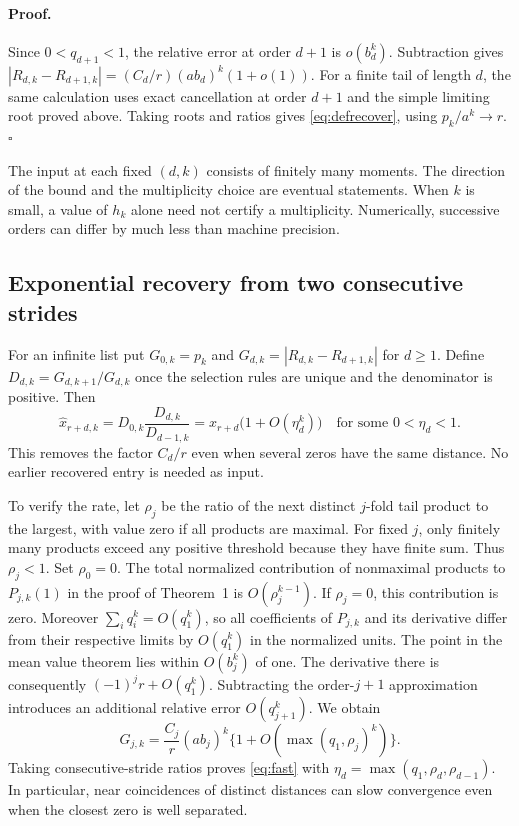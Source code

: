 \documentclass[11pt]{article}
\begin{document}
\paragraph{Proof.}
Since $0<q_{d+1}<1$, the relative error at order $d+1$ is $o(b_d^k)$.
Subtraction gives
$|R_{d,k}-R_{d+1,k}|=(C_d/r)(a b_d)^k(1+o(1))$.
For a finite tail of length $d$, the same calculation uses exact cancellation
at order $d+1$ and the simple limiting root proved above. Taking roots and
ratios gives \eqref{eq:defrecover}, using $p_k/a^k\to r$.
\hfill$\square$

The input at each fixed $(d,k)$ consists of finitely many moments. The direction
of the bound and the multiplicity choice are eventual statements. When $k$ is
small, a value of $h_k$ alone need not certify a multiplicity. Numerically,
successive orders can differ by much less than machine precision.


\subsection*{Exponential recovery from two consecutive strides}
For an infinite list put $G_{0,k}=p_k$ and
$G_{d,k}=|R_{d,k}-R_{d+1,k}|$ for $d\ge1$. Define
$D_{d,k}=G_{d,k+1}/G_{d,k}$ once the selection rules are unique and the
denominator is positive. Then
\begin{equation}\label{eq:fast}
 \widehat{x}_{r+d,k}=D_{0,k}\frac{D_{d,k}}{D_{d-1,k}}
       = x_{r+d}\bigl(1+O(\eta_d^k)\bigr)
       \quad\text{for some }0<\eta_d<1.
\end{equation}
This removes the factor $C_d/r$ even when several zeros have the same distance.
No earlier recovered entry is needed as input.

To verify the rate, let $\rho_j$ be the ratio of the next distinct $j$-fold
tail product to the largest, with value zero if all products are maximal.
For fixed $j$, only finitely many products exceed any positive threshold
because they have finite sum. Thus $\rho_j<1$. Set $\rho_0=0$.
The total normalized contribution of nonmaximal products to $P_{j,k}(1)$
in the proof of Theorem~1 is $O(\rho_j^{k-1})$. If $\rho_j=0$, this
contribution is zero. Moreover $\sum_i q_i^k=O(q_1^k)$, so all coefficients
of $P_{j,k}$ and its derivative differ from their respective limits by
$O(q_1^k)$ in the normalized units. The point in the mean value theorem
lies within $O(b_j^k)$ of one. The derivative there is consequently
$(-1)^j r+O(q_1^k)$. Subtracting the order-$j+1$ approximation introduces
an additional relative error $O(q_{j+1}^k)$. We obtain
\[
 G_{j,k}=\frac{C_j}{r}(a b_j)^k
      \{1+O(\max(q_1,\rho_j)^k)\}.
\]
Taking consecutive-stride ratios proves \eqref{eq:fast} with
$\eta_d=\max(q_1,\rho_d,\rho_{d-1})$. In particular, near coincidences of
distinct distances can slow convergence even when the closest zero is
well separated.
\end{document}
